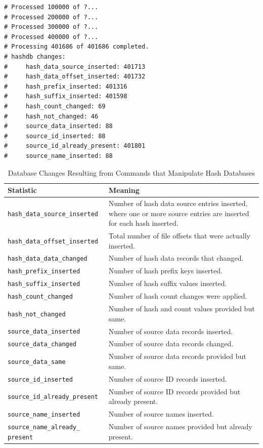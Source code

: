 \documentclass[11pt,fleqn]{article} %
\begin{document}
\lstset{style=customfile}
\begin{lstlisting}[float, caption={Example report of a database change from an import operation}, label=DatabaseChanges]
# Processed 100000 of ?...
# Processed 200000 of ?...
# Processed 300000 of ?...
# Processed 400000 of ?...
# Processing 401686 of 401686 completed.
# hashdb changes:
#     hash_data_source_inserted: 401713
#     hash_data_offset_inserted: 401732
#     hash_prefix_inserted: 401316
#     hash_suffix_inserted: 401598
#     hash_count_changed: 69
#     hash_not_changed: 46
#     source_data_inserted: 88
#     source_id_inserted: 88
#     source_id_already_present: 401801
#     source_name_inserted: 88
\end{lstlisting}

\begin{table}[!ht]
\centering
\caption{Database Changes Resulting from Commands that Manipulate Hash Databases}
\label{tab:changeStatistics}
\begin{tabular}{|p{5 cm}|p{8.8 cm}|}
\hline \hline
\textbf{Statistic} & \textbf{Meaning} \\
\hline

\verb+hash_data_source_inserted+ &  Number of hash data source entries inserted, where one or more source entries are inserted for each hash inserted.\\
\hline
\verb+hash_data_offset_inserted+ &  Total number of file offsets that were actually inserted.\\
\hline
\verb+hash_data_data_changed+ &  Number of hash data records that changed.\\
\hline

\verb+hash_prefix_inserted+ &  Number of hash prefix keys inserted.\\
\hline
\verb+hash_suffix_inserted+ &  Number of hash suffix values inserted.\\
\hline
\verb+hash_count_changed+ &  Number of hash count changes were applied.\\
\hline
\verb+hash_not_changed+ &  Number of hash and count values provided but same.\\
\hline

\verb+source_data_inserted+ &  Number of source data records inserted.\\
\hline
\verb+source_data_changed+ &  Number of source data records changed.\\
\hline
\verb+source_data_same+ &  Number of source data records provided but same.\\
\hline

\verb+source_id_inserted+ &  Number of source ID records inserted.\\
\hline
\verb+source_id_already_present+ &  Number of source ID records provided but already present.\\
\hline

\verb+source_name_inserted+ &  Number of source names inserted.\\
\hline
\verb+source_name_already_+ \verb+present+ &  Number of source names provided but already present.\\
\hline
\end{tabular}
\end{table}
\end{document}
